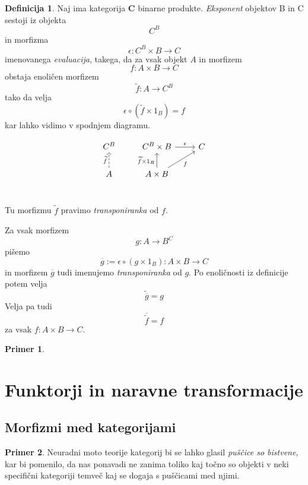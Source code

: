 \documentclass[12pt,a4paper]{book}
\theoremstyle{definition}
\newtheorem{definicija}{Definicija}[chapter]
\theoremstyle{plain}
\theoremstyle{definition}
\newtheorem{primer}{Primer}[section]
\theoremstyle{remark}
\newcommand{\cat}[1]{\textbf{#1}}
\begin{document}
\begin{definicija}
Naj ima kategorija $\cat{C}$ binarne produkte. \textit{Eksponent} objektov B in C sestoji iz objekta 
$$C^B$$
in morfizma
$$\epsilon : C^B \times B \to C$$ imenovanega \textit{evaluacija}, takega, da za vsak objekt $A$ in morfizem 
$$f : A \times B \to C$$
obstaja enoličen morfizem 
$$\widetilde{f} : A \to C^B$$
tako da velja
$$\epsilon \circ (\widetilde{f} \times 1_B) = f$$
kar lahko vidimo v spodnjem diagramu.

$$\begin{tikzcd}
C^B &  C^B \times B \ar[r, "\epsilon"] & C \\
A \ar[u, dashed, "\widetilde{f}"] &  A \times B \ar[u, "\widetilde{f} \times 1_B"] \ar[ur, "f"'] & \\
\end{tikzcd}$$

Tu morfizmu $\widetilde{f}$ pravimo \textit{transponiranka} od $f$.

\end{definicija}

Za vsak morfizem $$g : A \to B^C$$ pišemo
$$ \overline{g} := \epsilon \circ (g \times 1_B) : A \times B \to C$$
in morfizem $\overline{g}$ tudi imenujemo \textit{transponiranka} od $g$. Po enoličnosti iz definicije potem velja
$$\widetilde{\overline{g}} = g$$
Velja pa tudi
$$\overline{\widetilde{f}} = f$$
za vsak $f : A \times B \to C$.

\begin{primer}

\end{primer}

\section{Funktorji in naravne transformacije}

\subsection{Morfizmi med kategorijami}

\begin{primer}
Neuradni moto teorije kategorij bi se lahko glasil \textit{puščice so bistvene},
kar bi pomenilo, da nas ponavadi ne zanima toliko kaj točno so objekti v neki specifični kategoriji temveč kaj se dogaja s puščicami med njimi.
\end{primer}
\end{document}
